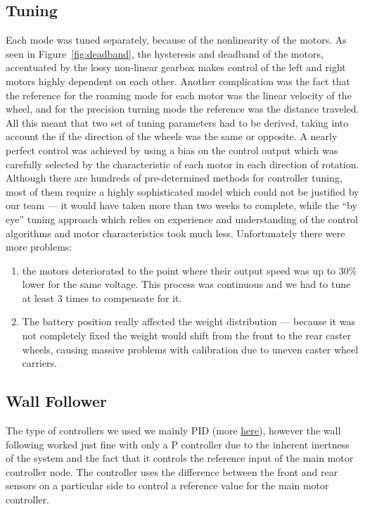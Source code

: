 \documentclass[10pt,a4paper,twocolumn]{article}
\begin{document}
\subsection{Tuning}
Each mode was tuned separately, because of the nonlinearity of the motors. As
seen in Figure~\ref{fig:deadband}, the hysteresis and deadband of the motors,
accentuated by the lossy non-linear gearbox makes control of the left and right
motors highly dependent on each other. Another complication was the fact that
the reference for the roaming mode for each motor was the linear velocity of the
wheel, and for the precision turning mode the reference was the distance
traveled. All this meant that two set of tuning parameters had to be derived,
taking into account the if the direction of the wheels was the same or opposite.
A nearly perfect control was achieved by using a bias on the control output
which was carefully selected by the characteristic of each motor in each
direction of rotation. Although there are hundreds of pre-determined methods for
controller tuning, most of them require a highly sophisticated model which could
not be justified by our team --- it would have taken more than two weeks to
complete, while the ``by eye'' tuning approach which relies on experience and
understanding of the control algorithms and motor characteristics took much
less. Unfortunately there were more problems: 
\begin{enumerate}
\item the motors deteriorated to the point where their output speed was up to
  30\% lower for the same voltage. This process was continuous and we had to
  tune at least 3 times to compensate for it.
\item The battery position really affected the weight distribution --- because it was
not completely fixed the weight would shift from the front to the rear caster
wheels, causing massive problems with calibration due to uneven caster wheel
carriers.
\end{enumerate}

\subsection{Wall Follower}
The type of controllers we used we mainly PID (more
\href{http://lmgtfy.com/?q=PID+tutorial}{here}), however the wall following
worked just fine with only a P controller due to the inherent inertness of the
system and the fact that it controls the reference input of the main motor
controller node. The controller uses the difference between the front and rear
sensors on a particular side to control a reference value for the main motor
controller.
\end{document}
